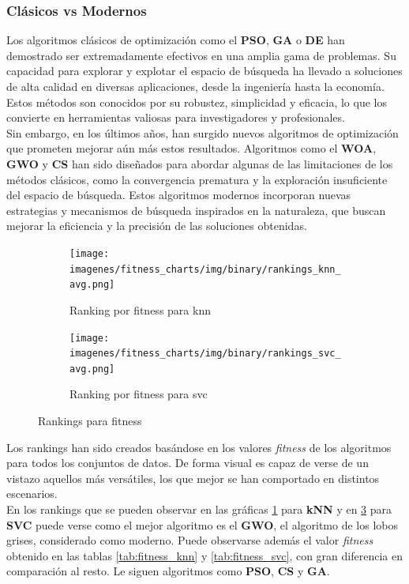 \subsubsection{Clásicos vs Modernos}
Los algoritmos clásicos de optimización como el \textbf{PSO}, \textbf{GA} o \textbf{DE} han demostrado ser extremadamente efectivos en una amplia gama de problemas. Su capacidad para explorar y explotar el espacio de búsqueda ha llevado a soluciones de alta calidad en diversas aplicaciones, desde la ingeniería hasta la economía. Estos métodos son conocidos por su robustez, simplicidad y eficacia, lo que los convierte en herramientas valiosas para investigadores y profesionales.\\[6pt]
Sin embargo, en los últimos años, han surgido nuevos algoritmos de optimización que prometen mejorar aún más estos resultados. Algoritmos como el \textbf{WOA}, \textbf{GWO} y \textbf{CS} han sido diseñados para abordar algunas de las limitaciones de los métodos clásicos, como la convergencia prematura y la exploración insuficiente del espacio de búsqueda. Estos algoritmos modernos incorporan nuevas estrategias y mecanismos de búsqueda inspirados en la naturaleza, que buscan mejorar la eficiencia y la precisión de las soluciones obtenidas.\\[6pt]

\begin{figure}[htb]
    \centering
    \begin{subfigure}[b]{1\textwidth}
        \texttt{[image: imagenes/fitness\_charts/img/binary/rankings\_knn\_avg.png]}
        \caption{Ranking por fitness para knn}
        \label{fig:ranking_knn}
    \end{subfigure}
    \begin{subfigure}[b]{1\textwidth}
        \texttt{[image: imagenes/fitness\_charts/img/binary/rankings\_svc\_avg.png]}
        \caption{Ranking por fitness para svc}
        \label{fig:ranking_svc}
    \end{subfigure}
    \caption{Rankings para fitness}
\end{figure}

Los rankings han sido creados basándose en los valores \textit{fitness} de los algoritmos para todos los conjuntos de datos. De forma visual es capaz de verse de un vistazo aquellos más versátiles, los que mejor se han comportado en distintos escenarios.\\[6pt]

En los rankings que se pueden observar en las gráficas \ref{fig:ranking_knn} para \textbf{kNN} y en \ref{fig:ranking_svc} para \textbf{SVC} puede verse como el mejor algoritmo es el \textbf{GWO}, el algoritmo de los lobos grises, considerado como moderno. Puede observarse además el valor \textit{fitness} obtenido en las tablas \ref{tab:fitness_knn} y \ref{tab:fitness_svc}, con gran diferencia en comparación al resto. Le siguen algoritmos como \textbf{PSO}, \textbf{CS} y \textbf{GA}.\\[6pt]

